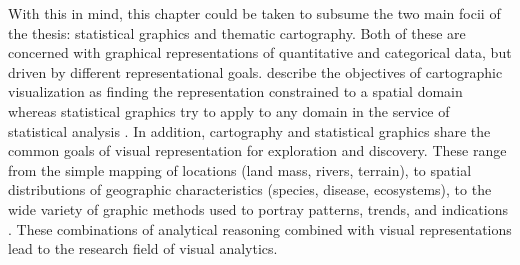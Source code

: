 With this in mind, this chapter could be taken to subsume the two main focii of the thesis: statistical graphics and thematic cartography. Both of these are concerned with graphical representations of quantitative and categorical data, but driven by different representational goals. \citeauthor{Friendly.2001} describe the objectives of cartographic visualization as finding the representation constrained to a spatial domain whereas statistical graphics try to apply to any domain in the service of statistical analysis . In addition, cartography and statistical graphics share the common goals of visual representation for exploration and discovery. These range from the simple mapping of locations (land mass, rivers, terrain), to spatial distributions of geographic characteristics (species, disease, ecosystems), to the wide variety of graphic methods used to portray patterns, trends, and indications . These combinations of analytical reasoning combined with visual representations lead to the research field of visual analytics.


